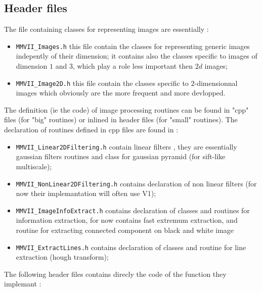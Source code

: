 
\subsection{Header files}


The file containing classes for representing images are essentially :

\begin{itemize}
	\item {\tt MMVII\_Images.h} this file contain the classes for representing 
		generic images indepently of their dimension;
		it contains also the classes specific to images of dimension $1$ and $3$,
		which play a role less important then $2d$ images;

	\item {\tt MMVII\_Image2D.h} this file contain the classes specific to $2$-dimensionnal
              images which obviously are the more frequent and more devlopped.
\end{itemize}


The definition (ie the code) of image processing routines can be found in "cpp" files
(for "big" routines) or inlined in header files (for "small" routines).
The declaration of routines defined in cpp files are found in :

\begin{itemize}
	\item {\tt MMVII\_Linear2DFiltering.h} contain linear filters , they are essentially
		gaussian filters routines and class for gaussian pyramid (for sift-like multiscale);

	\item {\tt MMVII\_NonLinear2DFiltering.h} contains declaration of non linear filters (for
		now their implemantation will often use  V1);

	\item {\tt MMVII\_ImageInfoExtract.h} contains declaration of classes and routines
		for information extraction, for now contains fast extremum extraction,
		and routine for extracting connected component on black and white image

	\item {\tt MMVII\_ExtractLines.h} contains declaration of classes and routine for 
		line extraction (hough transform);
\end{itemize}


The following header files contains direcly the code of the function they implemant :

